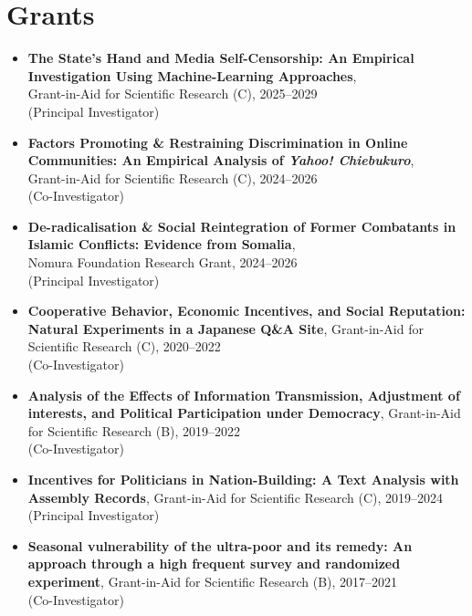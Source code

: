 \documentclass[12pt]{article}
\begin{document}
\section*{Grants}
\begin{itemize}
    \item \textbf{The State’s Hand and Media Self-Censorship: An Empirical Investigation Using Machine-Learning Approaches},\\
    Grant-in-Aid for Scientific Research (C), 2025--2029 \\ (Principal Investigator)

    \item \textbf{Factors Promoting \& Restraining Discrimination in Online Communities: An Empirical Analysis of \textit{Yahoo! Chiebukuro}},\\
    Grant-in-Aid for Scientific Research (C), 2024--2026 \\ (Co-Investigator)

    \item \textbf{De-radicalisation \& Social Reintegration of Former Combatants in Islamic Conflicts: Evidence from Somalia},\\
    Nomura Foundation Research Grant, 2024--2026 \\ (Principal Investigator)

    \item \textbf{Cooperative Behavior, Economic Incentives, and Social Reputation: Natural Experiments in a Japanese Q\&A Site}, 
    Grant-in-Aid for Scientific Research (C), 2020--2022 \\ (Co-Investigator)

    \item \textbf{Analysis of the Effects of Information Transmission, Adjustment of interests, and Political Participation under Democracy}, 
    Grant-in-Aid for Scientific Research (B), 2019--2022 \\ (Co-Investigator)

    \item \textbf{Incentives for Politicians in Nation-Building: A Text Analysis with Assembly Records}, 
    Grant-in-Aid for Scientific Research (C), 2019--2024 \\ (Principal Investigator)

    \item \textbf{Seasonal vulnerability of the ultra-poor and its remedy: An approach through a high frequent survey and randomized experiment}, 
    Grant-in-Aid for Scientific Research (B), 2017--2021 \\ (Co-Investigator)


\end{itemize}
\end{document}

